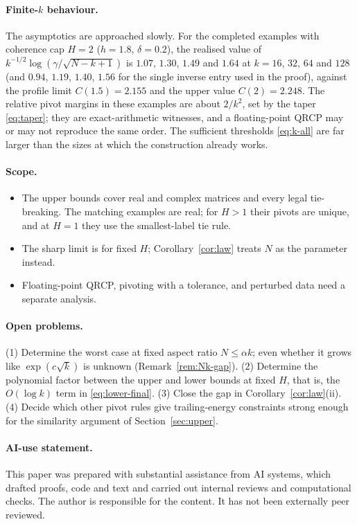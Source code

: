 \documentclass[11pt,a4paper]{article}
\theoremstyle{definition}
\numberwithin{equation}{section}
\begin{document}
\paragraph{Finite-$k$ behaviour.} The asymptotics are approached slowly. For the completed examples with coherence
cap $H=2$ ($h=1.8$, $\delta=0.2$), the realised value of $k^{-1/2}\log(\gamma/\sqrt{N-k+1})$ is $1.07$, $1.30$,
$1.49$ and $1.64$ at $k=16$, $32$, $64$ and $128$ (and $0.94$, $1.19$, $1.40$, $1.56$ for the single inverse entry
used in the proof), against the profile limit $C(1.5)=2.155$ and the upper value
$C(2)=2.248$. The relative pivot margins in these examples are about $2/k^2$, set by the taper \eqref{eq:taper}; they
are exact-arithmetic witnesses, and a floating-point QRCP may or may not reproduce the same order. The sufficient
thresholds \eqref{eq:k-all} are far larger than the sizes at which the construction already works.

\paragraph{Scope.}
\begin{itemize}
\item The upper bounds cover real and complex matrices and every legal tie-breaking. The matching examples are real;
  for $H>1$ their pivots are unique, and at $H=1$ they use the smallest-label tie rule.
\item The sharp limit is for fixed $H$; Corollary~\ref{cor:law} treats $N$ as the parameter instead.
\item Floating-point QRCP, pivoting with a tolerance, and perturbed data need a separate analysis.
\end{itemize}

\paragraph{Open problems.}
(1) Determine the worst case at fixed aspect ratio $N\le\alpha k$; even whether it grows like $\exp(c\sqrt k)$ is
unknown (Remark~\ref{rem:Nk-gap}). (2) Determine the polynomial factor between the upper and lower bounds at fixed $H$,
that is, the $O(\log k)$ term in \eqref{eq:lower-final}. (3) Close the gap in Corollary~\ref{cor:law}(ii).
(4) Decide which other pivot rules give trailing-energy constraints strong enough for the similarity argument of
Section~\ref{sec:upper}.

\paragraph{AI-use statement.} This paper was prepared with substantial assistance from AI systems, which drafted
proofs, code and text and carried out internal reviews and computational checks. The author is responsible for the
content. It has not been externally peer reviewed.
\end{document}

